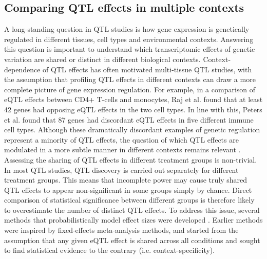 \subsection{Comparing QTL effects in multiple contexts}
A long-standing question in QTL studies is how gene expression is genetically regulated in different tissues, cell types and environmental contexts. Answering this question is important to understand which transcriptomic effects of genetic variation are shared or distinct in different biological contexts. Context-dependence of QTL effects has often motivated multi-tissue QTL studies, with the assumption that profiling QTL effects in different contexts can draw a more complete picture of gene expression regulation. For example, in a comparison of eQTL effects between CD4+ T-cells and monocytes, Raj et al. \cite{Raj2014-xw} found that at least 42 genes had opposing eQTL effects in the two cell types. In line with this, Peters et al. \cite{Peters2016-zk} found that 87 genes had discordant eQTL effects in five different immune cell types. Although these dramatically discordant examples of genetic regulation represent a minority of QTL effects, the question of which QTL effects are modulated in a more subtle manner in different contexts remains relevant \cite{Fairfax2012-ur,Lee2014-zo,Umans2021-fv,Van_de_Geijn2020-zn,Gamazon2018-uz}.\\

Assessing the sharing of QTL effects in different treatment groups is non-trivial. In most QTL studies, QTL discovery is carried out separately for different treatment groups. This means that incomplete power may cause truly shared QTL effects to appear non-significant in some groups simply by chance. Direct comparison of statistical significance between different groups is therefore likely to overestimate the number of distinct QTL effects. To address this issue, several methods that probabilistically model effect sizes were developed \cite{Flutre2013-sp,Li2018-kr,Sul2013-xm, Urbut2019-gf}. Earlier methods were inspired by fixed-effects meta-analysis methods, and started from the assumption that any given eQTL effect is shared across all conditions and sought to find statistical evidence to the contrary (i.e. context-specificity).\\

